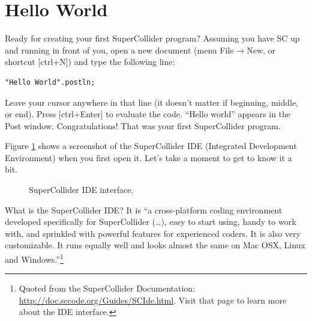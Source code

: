 \section{Hello World}

Ready for creating your first SuperCollider program? Assuming you have SC up and running in front of you, open a new document (menu File$\rightarrow$New, or shortcut [ctrl+N]) and type the following line:

 
\begin{lstlisting}[style=SuperCollider-IDE, basicstyle=\scttfamily\footnotesize ]
"Hello World".postln;
\end{lstlisting}
 

Leave your cursor anywhere in that line (it doesn't matter if beginning, middle, or end). Press [ctrl+Enter] to evaluate the code. ``Hello world'' appears in the Post window. Congratulations! That was your first SuperCollider program.

 
\bigskip
{}
\bigskip
 

Figure \ref{fig:scidegui} shows a screenshot of the SuperCollider IDE (Integrated Development Environment) when you first open it. Let's take a moment to get to know it a bit.

\begin{figure}[t]
\centerline{}
\caption{SuperCollider IDE interface.}
\label{fig:scidegui}
\end{figure}

What is the SuperCollider IDE? It is ``a cross-platform coding environment developed specifically for SuperCollider (\dots), easy to start using, handy to work with, and sprinkled with powerful features for experienced coders. It is also very customizable. It runs equally well and looks almost the same on Mac OSX, Linux and Windows.''\footnote{Quoted from the SuperCollider Documentation: \url{http://doc.sccode.org/Guides/SCIde.html}. Visit that page to learn more about the IDE interface.}

